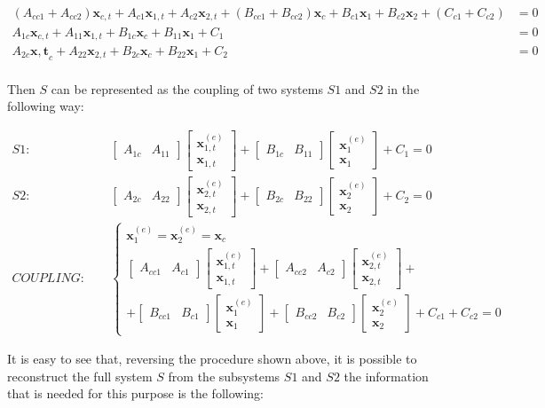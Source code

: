 \documentclass{scrartcl}
\begin{document}
$$
\begin{array}{ll}
(A_{cc1}+A_{cc2}) \mathbf{x}_{c,t} + A_{c1}  \mathbf{x}_{1,t} +
A_{c2}  \mathbf{x}_{2,t} + (B_{cc1}+B_{cc2}) \mathbf{x}_{c} +
B_{c1} \mathbf{x}_{1} + B_{c2} \mathbf{x}_{2} + (C_{c1} + C_{c2}) &= 0\\
%
A_{1c}  \mathbf{x}_{c,t} + A_{11}  \mathbf{x}_{1,t} + 
B_{1c}  \mathbf{x}_{c} + B_{11} \mathbf{x}_{1} + C_{1} &= 0\\
%
A_{2c}  \mathbf{x,t}_{c} + A_{22}  \mathbf{x}_{2,t} + 
B_{2c}  \mathbf{x}_{c} + B_{22} \mathbf{x}_{1} + C_{2} &= 0\\
\end{array}
$$

Then $S$ can be represented as the coupling of two systems $S1$ and $S2$ in 
the following way:

\newcommand {\matrow}[2]{\left[ \begin{array}{cc} #1 & #2 \end{array}\right]}
\newcommand {\matcol}[2]{\left[ \begin{array}{c} #1 \\ #2 \end{array}\right]}

\begin{eqnarray}
\label{eq:s1}
S1 : & & \,\, \matrow{A_{1c}}{A_{11}} \matcol{ \mathbf{x}_{1,t}^{(e)}}{ \mathbf{x}_{1,t}} +  \matrow{B_{1c}}{B_{11}} \matcol{ \mathbf{x}_{1}^{(e)}}{ \mathbf{x}_{1}} + C_{1} = 0 \\
%
\label{eq:s2}
S2 : & &\,\, \matrow{A_{2c}}{A_{22}} \matcol{ \mathbf{x}_{2,t}^{(e)}}
{ \mathbf{x}_{2,t}} +  \matrow{B_{2c}}{B_{22}} 
\matcol{ \mathbf{x}_{2}^{(e)}}{ \mathbf{x}_{2}} + C_{2} = 0 \\
%
\label{eq:s1s2coupling}
COUPLING : & & \,\, 
\left\{\begin{array}{l}
\mathbf{x}_{1}^{(e)} = \mathbf{x}_{2}^{(e)} = \mathbf{x}_{c} \\[.5cm]
\matrow{A_{cc1}}{A_{c1}} 
\matcol{ \mathbf{x}_{1,t}^{(e)}}{ \mathbf{x}_{1,t}} + 
\matrow{A_{cc2}}{A_{c2}} 
\matcol{ \mathbf{x}_{2,t}^{(e)}}{ \mathbf{x}_{2,t}} + \\
+ \matrow{B_{cc1}}{B_{c1}} 
\matcol{ \mathbf{x}_{1}^{(e)}}{ \mathbf{x}_{1}} +
\matrow{B_{cc2}}{B_{c2}} 
\matcol{ \mathbf{x}_{2}^{(e)}}{ \mathbf{x}_{2}} +
C_{c1} + C_{c2} = 0
\end{array}\right.
\end{eqnarray}

It is easy to see that, reversing the procedure shown above, it is possible 
to reconstruct the full system $S$ from the subsystems $S1$ and $S2$ the 
information that is needed for this purpose is the following:
\end{document}
